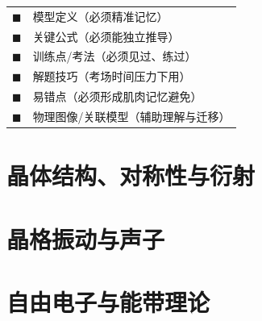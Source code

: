 \vspace{4pt}

\begin{cheatbox}[颜色速查]
\begin{tabular}{ll}
\textcolor{modelteal}{$\blacksquare$} & 模型定义（必须精准记忆） \\
\textcolor{successgreen}{$\blacksquare$} & 关键公式（必须能独立推导） \\
\textcolor{drillblue}{$\blacksquare$} & 训练点/考法（必须见过、练过） \\
\textcolor{alertred}{$\blacksquare$} & 解题技巧（考场时间压力下用） \\
\textcolor{errorred}{$\blacksquare$} & 易错点（必须形成肌肉记忆避免） \\
\textcolor{royalpurple}{$\blacksquare$} & 物理图像/关联模型（辅助理解与迁移） \\
\end{tabular}
\end{cheatbox}

\newpage

\tableofcontents
\newpage

\part{晶体结构、对称性与衍射}\label{part:crystal-structure}\setpartcolor{\value{part}}

\newpage

\newpage


\part{晶格振动与声子}\label{part:phonons}\setpartcolor{\value{part}}

\newpage

\newpage

\newpage


\part{自由电子与能带理论}\label{part:band-theory}\setpartcolor{\value{part}}

